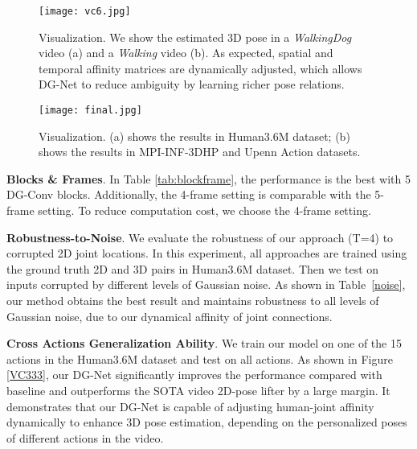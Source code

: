 \documentclass[journal]{IEEEtran}
\begin{document}
\begin{figure*}[t]
\centering
\texttt{[image: vc6.jpg]}
\caption{Visualization.
We show the estimated 3D pose in a \textit{WalkingDog} video (a) and a \textit{Walking} video (b).
As expected,
spatial and temporal affinity matrices are dynamically adjusted,
which allows DG-Net to reduce ambiguity by learning richer pose relations.
}
\label{VC3}
\vspace{-0.5cm}
\end{figure*}

\begin{figure*}[t]
\centering
\texttt{[image: final.jpg]}
\caption{Visualization. (a) shows the results in Human3.6M\cite{zhang2013actemes} dataset; (b) shows the results in MPI-INF-3DHP \cite{mono_3dhp2017}  and Upenn Action \cite{zhang2013actemes} datasets.
}
\label{VC33}
\vspace{-0.5cm}
\end{figure*}

\textbf{Blocks \& Frames}.
In Table \ref{tab:blockframe},
the performance is the best with 5 DG-Conv blocks.
Additionally,
the 4-frame setting is comparable with the 5-frame setting.
To reduce computation cost,
we choose the 4-frame setting.



\textbf{Robustness-to-Noise}.
We evaluate the robustness of our approach (T=4) to corrupted 2D joint locations.
In this experiment,
all approaches are trained using the ground truth 2D and 3D pairs in Human3.6M dataset.
Then we test on inputs corrupted by different levels of Gaussian noise.
As shown in Table~\ref{noise},
our method obtains the best result and maintains robustness to all levels of Gaussian noise,
due to our dynamical affinity of joint connections.


\textbf{Cross Actions Generalization Ability}.
We train our model on one of the 15 actions in the Human3.6M \cite{h36m_pami} dataset and test on all actions.
As shown in Figure \ref{VC333},
our DG-Net significantly improves the performance compared with baseline and outperforms the SOTA video 2D-pose lifter \cite{Cai_2019_ICCV} by a large margin.
It demonstrates that our DG-Net is capable of adjusting human-joint affinity dynamically to enhance 3D pose estimation,
depending on the personalized poses of different actions in the video.
\end{document}
